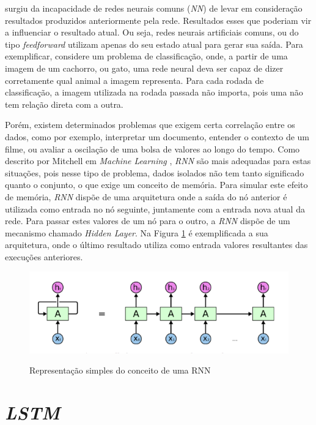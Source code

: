  surgiu da incapacidade de redes neurais comuns (\textit{\acrshort{NN}}) de levar em consideração resultados produzidos anteriormente pela rede. Resultados esses que poderiam vir a influenciar o resultado atual. Ou seja, redes neurais artificiais comuns, ou do tipo \textit{feedforward} utilizam apenas do seu estado atual para gerar sua saída. Para exemplificar, considere um problema de classificação, onde, a partir de uma imagem de um cachorro, ou gato, uma rede neural deva ser capaz de dizer corretamente qual animal a imagem representa. Para cada rodada de classificação, a imagem utilizada na rodada passada não importa, pois uma não tem relação direta com a outra. 

Porém, existem determinados problemas que exigem certa correlação entre os dados, como por exemplo, interpretar um documento, entender o contexto de um filme, ou avaliar a oscilação de uma bolsa de valores ao longo do tempo. Como descrito por Mitchell em \textit{Machine Learning} \cite{Mitchell_1997}, \textit{\acrshort{RNN}} são mais adequadas para estas situações, pois nesse tipo de problema, dados isolados não tem tanto significado quanto o conjunto, o que exige um conceito de memória. Para simular este efeito de memória, \textit{\acrshort{RNN}} dispõe de uma arquitetura onde a saída do nó anterior é utilizada como entrada no nó seguinte, juntamente com a entrada nova atual da rede. Para passar estes valores de um nó para o outro, a \textit{\acrshort{RNN}} dispõe de um mecanismo chamado \textit{Hidden Layer}. Na Figura \ref{figure:rnn} é exemplificada a sua arquitetura, onde o último resultado utiliza como entrada valores resultantes das execuções anteriores.

\begin{figure}[htbp]
    \centering
    \includegraphics[scale=0.4]{monography/img/models/rnnExample.png}
    \label{figure:rnn}
    \caption[Representação simples do conceito de um RNN]{Representação simples do conceito de uma RNN \footnotemark}
\end{figure}

\section{\textit{\acrfull{LSTM}}}


